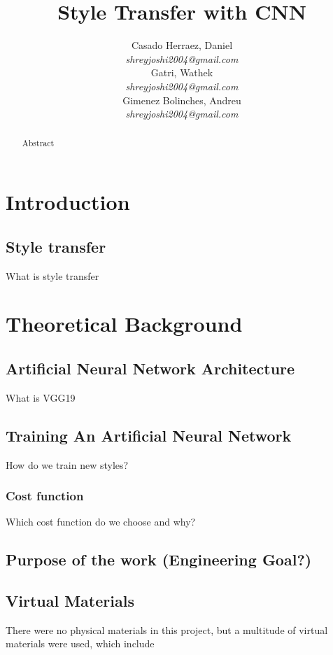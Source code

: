 \documentclass{article}
\title{\textbf{Style Transfer with CNN}}
\author{
  Casado Herraez, Daniel \\
  \textit{shreyjoshi2004@gmail.com} \\
  \And
  Gatri, Wathek \\
  \textit{shreyjoshi2004@gmail.com} \\
  \And
  Gimenez Bolinches, Andreu \\
  \textit{shreyjoshi2004@gmail.com} \\
}
\begin{document}
\maketitle
\begin{abstract} \normalsize

Abstract

\end{abstract}


\clearpage

\tableofcontents
\clearpage

\section{Introduction}
\subsection{Style transfer}
What is style transfer

\section{Theoretical Background}

\subsection{Artificial Neural Network Architecture}
What is VGG19

\subsection{Training An Artificial Neural Network}
How do we train new styles?

\subsubsection{Cost function}
Which cost function do we choose and why?

\subsection{Purpose of the work (Engineering Goal?)}

\subsection{Virtual Materials}
There were no physical materials in this project, but a multitude of virtual materials were used, which include
\end{document}
